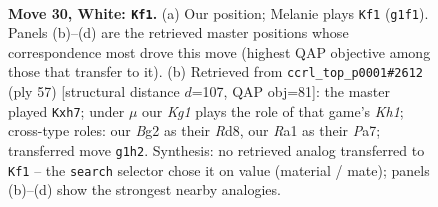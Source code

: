 \documentclass[11pt]{article}
\begin{document}
\clearpage

\begin{figure}[p]\centering
\begin{subfigure}{0.46\textwidth}\centering
\resizebox{\linewidth}{!}{%
\newchessgame
\chessboard[
  setfen={2Q5/pp1n2kp/7p/1P3q2/3P4/3r4/4NbB1/R5KR w - - 6 30},
  showmover=false,
  pgfstyle=straightmove, color=movearrow, markmove={g1-f1}
]}
\caption{}
\end{subfigure}\hfill
\begin{subfigure}{0.46\textwidth}\centering
\resizebox{\linewidth}{!}{%
\newchessgame
\chessboard[
  setfen={3r1r1k/p6R/6np/7P/3PQP2/2P1P1K1/4q3/8 b - - 1 29},
  showmover=false,
  pgfstyle=straightmove, color=movearrow, markmove={h8-h7}
]}
\caption{}
\end{subfigure}
\\[4pt]

\caption{\textbf{Move 30, White: \texttt{Kf1}.} (a) Our position; Melanie plays \texttt{Kf1} (\texttt{g1f1}). Panels (b)--(d) are the retrieved master positions whose correspondence most drove this move (highest QAP objective among those that transfer to it). (b) Retrieved from \texttt{ccrl\_top\_p0001\#2612} (ply 57) [structural distance $d$=107, QAP obj=81]: the master played \texttt{Kxh7}; under $\mu$ our \emph{Kg1} plays the role of that game's \emph{Kh1}; cross-type roles: our \emph{B}g2 as their \emph{R}d8, our \emph{R}a1 as their \emph{P}a7; transferred move \texttt{g1h2}. Synthesis: no retrieved analog transferred to \texttt{Kf1} -- the \texttt{search} selector chose it on value (material / mate); panels (b)--(d) show the strongest nearby analogies.}
\label{fig:thought-m58}
\end{figure}

\clearpage
\end{document}
